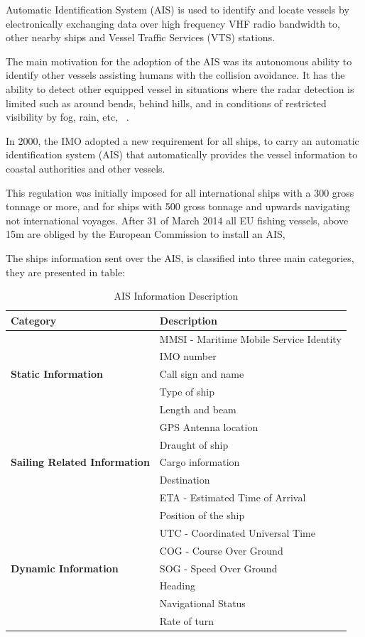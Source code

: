 Automatic Identification System (AIS) is used to identify and locate vessels by electronically exchanging data over high frequency VHF radio bandwidth to, other nearby ships and Vessel Traffic Services (VTS) stations.

The main motivation for the adoption of the AIS was its autonomous ability to identify other vessels assisting humans with the collision avoidance. It has the ability to detect other equipped vessel in situations where the radar detection is limited such as around bends, behind hills, and in conditions of restricted visibility by fog, rain, etc, ~\cite{Harati-Mokhtari2007}. 

In 2000, the IMO adopted a new requirement for all ships, to carry an automatic identification system (AIS) that automatically provides the vessel information to coastal authorities and other vessels.

This regulation was initially imposed for all international ships with a 300 gross tonnage or more, and for ships with 500 gross tonnage and upwards navigating not international voyages. After 31 of March 2014 all EU fishing vessels, above 15m are obliged by the European Commission to install an AIS, ~\cite{EC2018}

The ships information sent over the AIS, is classified into three main categories, they are presented in table:
\begin{table}[H]
\centering
\caption{AIS Information Description}
\label{Table: AIS Categories}
\begin{tabular}{|l|l|}
\hline
\textbf{Category} & \textbf{Description} \\ \hline
 & MMSI - Maritime Mobile Service Identity \\ \cline{2-2} 
 & IMO number \\ \cline{2-2} 
\textbf{Static Information} & Call sign and name \\ \cline{2-2} 
 & Type of ship \\ \cline{2-2} 
 & Length and beam \\ \cline{2-2} 
 & GPS Antenna location \\ \hline
 & Draught of ship \\ \cline{2-2} 
\textbf{Sailing Related Information} & Cargo information \\ \cline{2-2} 
 & Destination \\ \cline{2-2} 
 & ETA - Estimated Time of Arrival \\ \hline
 & Position of the ship \\ \cline{2-2} 
 & UTC - Coordinated Universal Time \\ \cline{2-2} 
 & COG - Course Over Ground \\ \cline{2-2} 
\textbf{Dynamic Information} & SOG - Speed Over Ground \\ \cline{2-2} 
 & Heading \\ \cline{2-2}
 & Navigational Status \\ \cline{2-2}
 & Rate of turn \\ \hline
\end{tabular}
\end{table}

